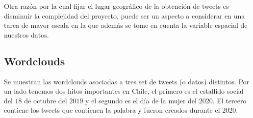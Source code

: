 \documentclass{article}
\begin{document}
\begin{remark}
	Otra razón por la cual fijar el lugar geográfico de la obtención de tweets es disminuir la complejidad del proyecto, puede ser un aspecto a considerar en una tarea de mayor escala en la que además se tome en cuenta la variable espacial de nuestros datos.	
\end{remark}

\subsection{Wordclouds}
	Se muestran las wordclouds asociadas a tres set de tweets (o datos) distintos. Por un lado tenemos dos hitos importantes en Chile, el primero es el estallido social del $18$ de octubre del $2019$ y el segundo es el día de la mujer del $2020$. El tercero contiene los tweets que contienen la palabra  y fueron creados durante el $2020$.
	
	
	
\end{document}
